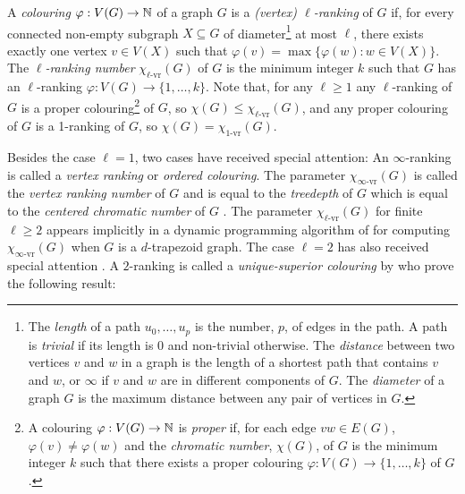 \documentclass[kpfonts]{patmorin}
\newcommand{\defin}[1]{\emph{\color{brightmaroon}#1}}
\newcommand{\rn}[1]{\chi_{\operatorname{#1-vr}}}
\newcommand{\irn}{\rn{\infty}}
\newcommand{\lrn}{\rn{\ell}}
\theoremstyle{named}
\begin{document}
A \defin{colouring} $\varphi:V(G)\to \mathbb{N}$ of a graph $G$ is a \defin{(vertex) $\ell$-ranking} of $G$ if, for every connected non-empty subgraph $X\subseteq G$ of diameter\footnote{The \defin{length} of a path $u_0,\ldots,u_p$ is the number, $p$, of edges in the path. A path is \defin{trivial} if its length is 0 and non-trivial otherwise. The \defin{distance} between two vertices $v$ and $w$ in a graph is the length of a shortest path that contains $v$ and $w$, or $\infty$ if $v$ and $w$ are in different components of $G$. The \defin{diameter} of a graph $G$ is the maximum distance between any pair of vertices in $G$.}  at most $\ell$, there exists exactly one vertex $v\in V(X)$ such that $\varphi(v)=\max\{\varphi(w):w\in V(X)\}$.  The \defin{$\ell$-ranking number} $\lrn(G)$ of $G$ is the minimum integer $k$ such that $G$ has an $\ell$-ranking $\varphi:V(G)\to \{1,\ldots,k\}$.  Note that, for any $\ell\ge 1$ any $\ell$-ranking of $G$ is a proper colouring\footnote{A colouring $\varphi:V(G)\to \mathbb{N}$ is \defin{proper} if, for each edge $vw\in E(G)$, $\varphi(v)\neq\varphi(w)$ and the \defin{chromatic number}, $\chi(G)$, of $G$ is the minimum integer $k$ such that there exists a proper colouring $\varphi:V(G)\to\{1,\ldots,k\}$ of $G$.} of $G$, so $\chi(G)\le \lrn(G)$, and any proper colouring of $G$ is a 1-ranking of $G$, so $\chi(G)=\rn{1}(G)$.

Besides the case $\ell=1$, two cases have received special attention: An $\infty$-ranking is called a \defin{vertex ranking} or \defin{ordered colouring}. The parameter $\irn(G)$ is called the \defin{vertex ranking number} of $G$ and is equal to the \defin{treedepth} of $G$ which is equal to the \defin{centered chromatic number} of $G$ \cite{nesetril.ossona:tree-depth}.
The parameter $\lrn(G)$ for finite $\ell\ge 2$ appears implicitly in a dynamic programming algorithm of \citet{deogun.kloks.ea:on} for computing $\irn(G)$ when $G$ is a $d$-trapezoid graph.  The case $\ell=2$ has also received special attention \cite{almeter.demircan.ea:graph,karpas.neiman.ea:on,shalu.antony:complexity}. A $2$-ranking is called a \defin{unique-superior colouring} by \citet{karpas.neiman.ea:on} who prove the following result:
\end{document}
